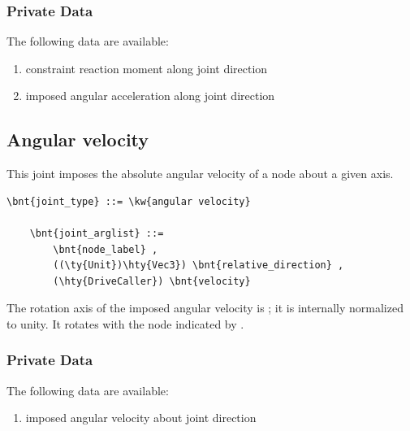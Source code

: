\subsubsection{Private Data}
The following data are available:
\begin{enumerate}
\item {} constraint reaction moment along joint direction
\item {} imposed angular acceleration along joint direction
\end{enumerate}



\subsection{Angular velocity}
This joint imposes the absolute angular velocity of a node
about a given axis.
\begin{Verbatim}[commandchars=\\\{\}]
    \bnt{joint_type} ::= \kw{angular velocity}

    \bnt{joint_arglist} ::=
        \bnt{node_label} ,
        ((\ty{Unit})\hty{Vec3}) \bnt{relative_direction} , 
        (\hty{DriveCaller}) \bnt{velocity}
\end{Verbatim}
The rotation axis of the imposed angular velocity is ;
it is internally normalized to unity.
It rotates with the node indicated by .

\subsubsection{Private Data}
The following data are available:
\begin{enumerate}
\item {} imposed angular velocity about joint direction
\end{enumerate}



